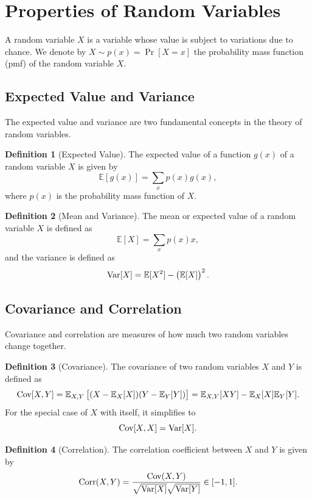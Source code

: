 \documentclass[12pt,openany]{book}
\theoremstyle{definition}
\newtheorem{definition}{Definition}[chapter]
\newcommand{\E}{\mathbb{E}}
\newcommand{\Cov}{\textnormal{Cov}}
\newcommand{\corr}{\textnormal{Corr}}
\newcommand{\Var}{\textnormal{Var}}
\begin{document}
	\section{Properties of Random Variables}
	A random variable \( X \) is a variable whose value is subject to variations due to chance. We denote by \( X \sim p(x) = \Pr[X = x] \) the probability mass function (pmf) of the random variable \( X \).
	
	\subsection{Expected Value and Variance}
	The expected value and variance are two fundamental concepts in the theory of random variables.
	
	\begin{definition}[Expected Value]
		The expected value of a function \( g(x) \) of a random variable \( X \) is given by
		\[
		\E[g(x)] = \sum_x p(x) g(x),
		\]
		where \( p(x) \) is the probability mass function of \( X \).
	\end{definition}
	
	\begin{definition}[Mean and Variance]
		The mean or expected value of a random variable \( X \) is defined as
		\[
		\E[X] = \sum_x p(x) x,
		\]
		and the variance is defined as
		\[
		\Var[X] = \E[X^2] - \left(\E[X]\right)^2.
		\]
	\end{definition}
	
	\subsection{Covariance and Correlation}
	Covariance and correlation are measures of how much two random variables change together.
	
	\begin{definition}[Covariance]
		The covariance of two random variables \( X \) and \( Y \) is defined as
		\[
		\Cov[X, Y] = \E_{X,Y}\left[(X - \E_X[X])(Y - \E_Y[Y])\right] = \E_{X,Y}[XY] - \E_X[X]\E_Y[Y].
		\]
		For the special case of \( X \) with itself, it simplifies to
		\[
		\Cov[X, X] = \Var[X].
		\]
	\end{definition}
	
	\begin{definition}[Correlation]
		The correlation coefficient between \( X \) and \( Y \) is given by
		\[
		\corr(X, Y) = \frac{\Cov(X, Y)}{\sqrt{\Var[X]}\sqrt{\Var[Y]}} \in [-1, 1].
		\]
	\end{definition}
	
\end{document}
